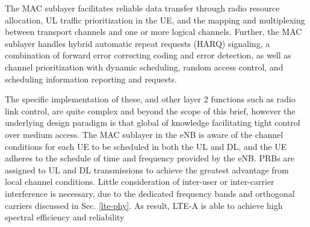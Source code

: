 The MAC sublayer facilitates reliable data transfer through radio resource allocation, UL traffic prioritization in the UE, and the mapping and multiplexing between transport channels and one or more logical channels. Further, the MAC sublayer handles hybrid automatic repeat requests (HARQ) signaling, a combination of forward error correcting coding and error detection, as well as channel prioritization with dynamic scheduling, random access control, and scheduling information reporting and requests.

The specific implementation of these, and other layer 2 functions such as radio link control, are quite complex and beyond the scope of this brief, however the underlying design paradigm is that global of knowledge facilitating tight control over medium access. The MAC sublayer in the eNB is aware of the channel conditions for each UE to be scheduled in both the UL and DL, and the UE adheres to the schedule of time and frequency provided by the eNB.  PRBs are assigned to UL and DL transmissions to achieve the greatest advantage from local channel conditions. Little consideration of inter-user or inter-carrier interference is necessary, due to the dedicated frequency bands and orthogonal carriers discussed in Sec. \ref{lte-phy}.  As result, LTE-A is able to achieve high spectral efficiency and reliability 


